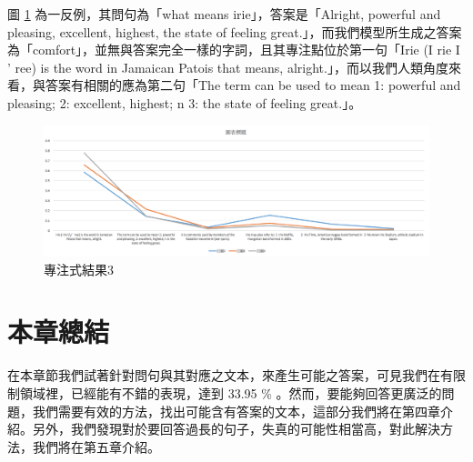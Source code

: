 圖 \ref{fig:attn_3} 為一反例，其問句為「what means irie」，答案是「Alright, powerful and pleasing, excellent, highest, the state of feeling great.」，而我們模型所生成之答案為「comfort」，並無與答案完全一樣的字詞，且其專注點位於第一句「Irie (I rie I '  ree) is the word in Jamaican Patois that means, alright.」，而以我們人類角度來看，與答案有相關的應為第二句「The term can be used to mean 1: powerful and pleasing; 2: excellent, highest; n 3: the state of feeling great.」。
\begin{figure}
    \centering
    \includegraphics[scale=0.55,angle=90]{images/chap3_attn4.png}
    \caption{專注式結果3}\label{fig:attn_3}
\end{figure}
\begin{figure}
\end{figure}
\section{本章總結}
在本章節我們試著針對問句與其對應之文本，來產生可能之答案，可見我們在有限制領域裡，已經能有不錯的表現，達到 33.95 \% 。然而，要能夠回答更廣泛的問題，我們需要有效的方法，找出可能含有答案的文本，這部分我們將在第四章介紹。另外，我們發現對於要回答過長的句子，失真的可能性相當高，對此解決方法，我們將在第五章介紹。
